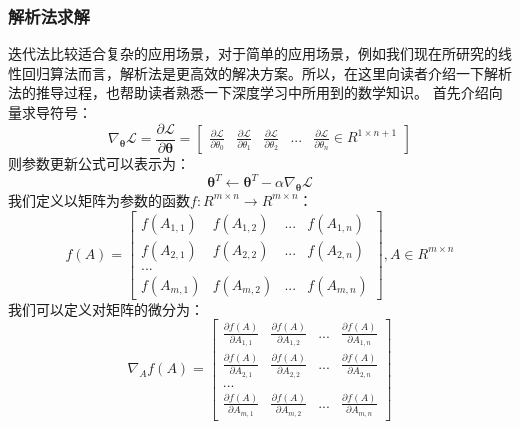 \documentclass[UTF8]{article}
\begin{document}
\subsubsection{解析法求解}
迭代法比较适合复杂的应用场景，对于简单的应用场景，例如我们现在所研究的线性回归算法而言，解析法是更高效的解决方案。所以，在这里向读者介绍一下解析法的推导过程，也帮助读者熟悉一下深度学习中所用到的数学知识。
首先介绍向量求导符号：
\begin{equation}
\nabla _{\boldsymbol{\theta}}\mathcal{L} = \frac{ \partial{\mathcal{L} }}{ \partial{\boldsymbol{\theta}} } = \begin{bmatrix}
\frac{ \partial{\mathcal{L} }}{ \partial{\theta _{0}} } & \frac{ \partial{\mathcal{L} }}{ \partial{\theta _{1}} } & \frac{ \partial{\mathcal{L} }}{ \partial{\theta _{2}} } & ... & \frac{ \partial{\mathcal{L} }}{ \partial{\theta _{n}} } \in R^{1 \times n+1}
\end{bmatrix}
\label{lrrn-scala-vector-gradient-def}
\end{equation}
则参数更新公式可以表示为：
\begin{equation}
\boldsymbol{\theta}^{T} \leftarrow \boldsymbol{\theta}^{T} - \alpha \nabla_{\boldsymbol{\theta}} \mathcal{L}
\label{lrrn-vector-parameter-update-formula}
\end{equation}
我们定义以矩阵为参数的函数$f:  R^{m \times n} \to R^{m \times n}$：
\begin{equation}
f(A) = \begin{bmatrix}
f(A_{1,1}) & f(A_{1,2}) & ... & f(A_{1,n}) \\
f(A_{2,1}) & f(A_{2,2}) & ... & f(A_{2,n}) \\
... \\
f(A_{m,1}) & f(A_{m,2}) & ... & f(A_{m,n})
\end{bmatrix}, A \in R^{m \times n}
\label{lrrn-function-matrix-parameter}
\end{equation}
我们可以定义对矩阵的微分为：
\begin{equation}
\nabla _{A}f(A) = \begin{bmatrix}
\frac{ \partial{f(A)} }{ \partial{A_{1,1}} } & \frac{ \partial{f(A)} }{ \partial{A_{1,2}} } & ... & \frac{ \partial{f(A)} }{ \partial{A_{1,n}} } \\
\frac{ \partial{f(A)} }{ \partial{A_{2,1}} } & \frac{ \partial{f(A)} }{ \partial{A_{2,2}} } & ... & \frac{ \partial{f(A)} }{ \partial{A_{2,n}} } \\
... \\
\frac{ \partial{f(A)} }{ \partial{A_{m,1}} } & \frac{ \partial{f(A)} }{ \partial{A_{m,2}} } & ... & \frac{ \partial{f(A)} }{ \partial{A_{m,n}} }
\end{bmatrix}
\label{lrrn-function-matrix-parameter-gradient}
\end{equation}
\end{document}
